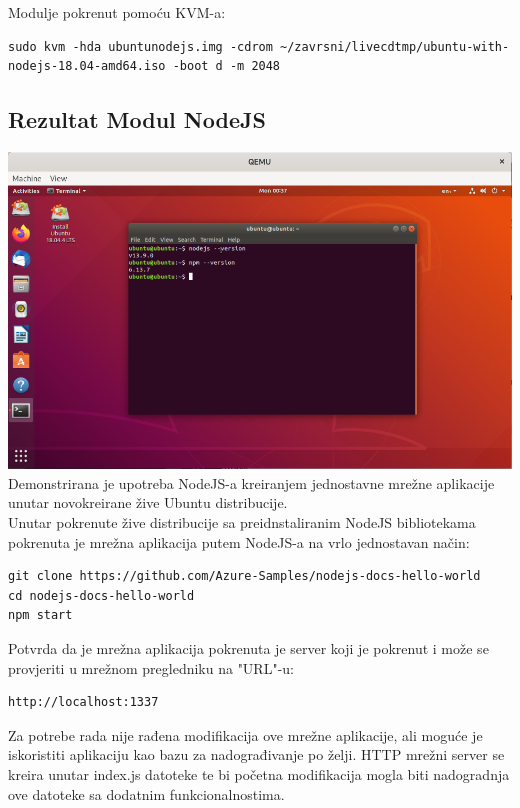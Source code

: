 \documentclass[12pt,vi]{mitthesis}
\begin{document}
\noindent 
Modulje pokrenut pomoću KVM-a:
\begin{lstlisting}[style=BashInputStyle]
sudo kvm -hda ubuntunodejs.img -cdrom ~/zavrsni/livecdtmp/ubuntu-with-nodejs-18.04-amd64.iso -boot d -m 2048
\end{lstlisting}

\subsection*{Rezultat Modul NodeJS}
\includegraphics[width=\linewidth]{images/ModulNodeJSUbuntu.png}\\
\indent
Demonstrirana je upotreba NodeJS-a kreiranjem jednostavne mrežne aplikacije unutar novokreirane žive Ubuntu distribucije.\\
Unutar pokrenute žive distribucije sa preidnstaliranim NodeJS bibliotekama pokrenuta je mrežna aplikacija putem NodeJS-a na vrlo jednostavan način:
\begin{lstlisting}[style=BashInputStyle]
git clone https://github.com/Azure-Samples/nodejs-docs-hello-world
cd nodejs-docs-hello-world
npm start
\end{lstlisting}
Potvrda da je mrežna aplikacija pokrenuta je server koji je pokrenut i može se provjeriti u mrežnom pregledniku na "URL"-u:
\begin{lstlisting}[style=BashInputStyle]
http://localhost:1337
\end{lstlisting}
Za potrebe rada nije rađena modifikacija ove mrežne aplikacije, ali moguće je iskoristiti aplikaciju kao bazu za nadograđivanje po želji. HTTP mrežni server se kreira unutar index.js datoteke te bi početna modifikacija mogla biti nadogradnja ove datoteke sa dodatnim funkcionalnostima.\\
\end{document}
